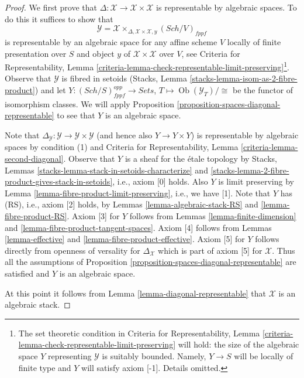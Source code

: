 \documentclass{stacks-project}
\theoremstyle{plain}
\theoremstyle{definition}
\theoremstyle{remark}
\numberwithin{equation}{subsection}
\def\Sch{\mathit{Sch}}
\def\Ob{\mathop{\mathrm{Ob}}\nolimits}
\begin{document}
\begin{proof}
We first prove that $\Delta : \mathcal{X} \to \mathcal{X} \times \mathcal{X}$
is representable by algebraic spaces. To do this it suffices to show
that
$$
\mathcal{Y} =
\mathcal{X} \times_{\Delta, \mathcal{X} \times \mathcal{X}, y} (\Sch/V)_{fppf}
$$
is representable by an algebraic space for any affine scheme $V$ locally
of finite presentation over $S$ and object $y$ of
$\mathcal{X} \times \mathcal{X}$ over $V$, see
Criteria for Representability, Lemma
\ref{criteria-lemma-check-representable-limit-preserving}\footnote{The
set theoretic condition in Criteria for Representability, Lemma
\ref{criteria-lemma-check-representable-limit-preserving}
will hold: the size of the algebraic space $Y$ representing $\mathcal{Y}$ is
suitably bounded. Namely, $Y \to S$ will be locally of finite type and $Y$
will satisfy axiom [-1]. Details omitted.}.
Observe that $\mathcal{Y}$ is fibred in setoids
(Stacks, Lemma \ref{stacks-lemma-isom-as-2-fibre-product})
and let $Y : (\Sch/S)_{fppf}^{opp} \to \textit{Sets}$,
$T \mapsto \Ob(\mathcal{Y}_T)/\cong$ be the functor of isomorphism
classes. We will apply
Proposition \ref{proposition-spaces-diagonal-representable}
to see that $Y$ is an algebraic space.

\medskip\noindent
Note that
$\Delta_\mathcal{Y} : \mathcal{Y} \to \mathcal{Y} \times \mathcal{Y}$
(and hence also $Y \to Y \times Y$)
is representable by algebraic spaces by condition (1) and
Criteria for Representability, Lemma \ref{criteria-lemma-second-diagonal}.
Observe that $Y$ is a sheaf for the \'etale topology by
Stacks, Lemmas \ref{stacks-lemma-stack-in-setoids-characterize} and
\ref{stacks-lemma-2-fibre-product-gives-stack-in-setoids}, i.e.,
axiom [0] holds. Also $Y$ is limit preserving by
Lemma \ref{lemma-fibre-product-limit-preserving}, i.e., we have [1].
Note that $Y$ has (RS), i.e., axiom [2] holds, by
Lemmas \ref{lemma-algebraic-stack-RS} and
\ref{lemma-fibre-product-RS}. Axiom [3] for $Y$ follows
from Lemmas \ref{lemma-finite-dimension} and
\ref{lemma-fibre-product-tangent-spaces}.
Axiom [4] follows from Lemmas \ref{lemma-effective} and
\ref{lemma-fibre-product-effective}.
Axiom [5] for $Y$ follows directly from openness of versality
for $\Delta_\mathcal{X}$ which is part of axiom [5] for $\mathcal{X}$.
Thus all the assumptions of
Proposition \ref{proposition-spaces-diagonal-representable}
are satisfied and $Y$ is an algebraic space.

\medskip\noindent
At this point it follows from Lemma \ref{lemma-diagonal-representable}
that $\mathcal{X}$ is an algebraic stack.
\end{proof}
\end{document}
